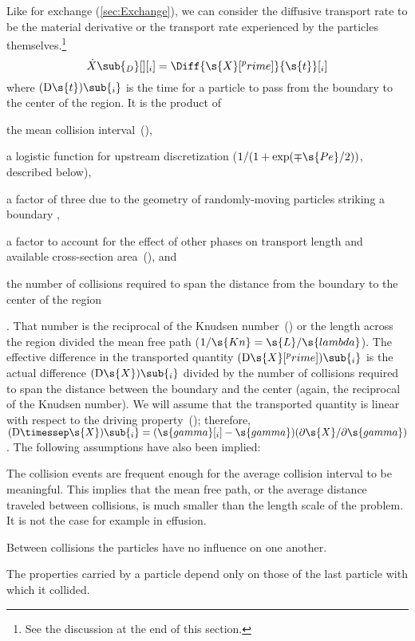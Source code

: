 Like for exchange (\autoref{sec:Exchange}), we can consider the diffusive transport rate to be the material derivative or the transport rate experienced by the particles themselves.\footnote{See the discussion at the end of this section.}
\begin{equation}
  \label{eq:DiffusiveTransport1}
  \dot{X}\sub{_D}[ ][_i] = \Diff{\s{X}[^prime]}{\s{t}}[_i]
\end{equation}
where $(\mathrm{D}\s{t})\sub{_i}$ is the time for a particle to pass from the boundary to the center of the region.  It is the product of \begin{inparaenum}[(1)]\item the mean collision interval~(), \item a logistic function for upstream discretization ($1/(1 + \exp(\mp\s{Pe}/2))$, described below), \item a factor of three due to the geometry of randomly-moving particles striking a boundary \cite[p.~33--35]{Present1958}, \item a factor to account for the effect of other phases on transport length and available cross-section area~(), and \item the number of collisions required to span the distance from the boundary to the center of the region\end{inparaenum}.  That number is the reciprocal of the Knudsen number~() or the length across the region divided the mean free path ($1/\s{Kn} = \s{L}/\s{lambda}$).  The effective difference in the transported quantity $(\mathrm{D}\s{X}[^prime])\sub{_i}$ is the actual difference $(\mathrm{D}\s{X})\sub{_i}$ divided by the number of collisions required to span the distance between the boundary and the center (again, the reciprocal of the Knudsen number).  We will assume that the transported quantity is linear with respect to the driving property~(); therefore, $(\mathrm{D}\timessep\s{X})\sub{_i} = (\s{gamma}[_i] - \s{gamma})(\partial\s{X}/\partial\s{gamma})$.  The following assumptions have also been implied:
\begin{enumerate*}
  \item The collision events are frequent enough for the average collision interval to be meaningful.  This implies that the mean free path, or the average distance traveled between collisions, is much smaller than the length scale of the problem.  It is not the case for example in effusion.
  \item Between collisions the particles have no influence on one another.
  \item The properties carried by a particle depend only on those of the last particle with which it collided.
\end{enumerate*}
